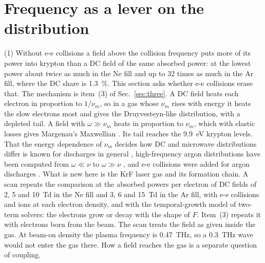 \documentclass[11pt]{article}
\numberwithin{equation}{section}
\begin{document}
\section{Frequency as a lever on the distribution}
\label{sec:share}

{\noindent}(1) Without e-e collisions a field above the collision frequency puts
more of its power into krypton than a DC field of the same absorbed power: at the
lowest power about twice as much in the Ne fill and up to 32 times as much in the Ar
fill, where the DC share is 1.3~\%. This section asks whether e-e collisions erase
that. The mechanism is item~(3) of Sec.~\ref{sec:three}. A DC
field heats each electron in proportion to $1/\nu_m$, so in a gas whose $\nu_m$ rises
with energy it heats the slow electrons most and gives the Druyvesteyn-like
distribution, with a depleted tail. A field with $\omega\gg\nu_m$ heats in
proportion to $\nu_m$, which with elastic losses gives Margenau's Maxwellian
\cite{Margenau1946}. Its tail reaches the 9.9~eV krypton levels. That the energy
dependence of $\nu_m$ decides how DC and microwave distributions differ is known for
discharges in general \cite{Karoulina1988}, high-frequency argon distributions have
been computed from $\omega\ll\nu$ to $\omega\gg\nu$ \cite{FerreiraLoureiro1983}, and e-e
collisions were added for argon discharges \cite{Sa1992,Wang1993}. What is new here is
the KrF laser gas and its formation chain. A scan repeats the comparison
at the absorbed powers per electron of DC fields of 2, 5 and 10~Td in the Ne fill and
3, 6 and 15~Td in the Ar fill, with e-e collisions
and ions at each electron density, and with the temporal-growth model of two-term
solvers: the electrons grow or decay with the shape of $F$. Item~(3) repeats it with
electrons born from the beam. The scan treats the field as given inside the gas. At beam-on density the
plasma frequency is 0.47~THz, so a 0.3~THz wave would not enter the gas there. How a
field reaches the gas is a separate question of coupling.
\end{document}
